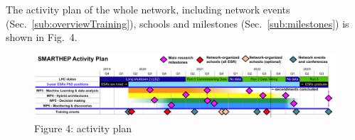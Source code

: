 The activity plan of the whole network, including network events (Sec.~\ref{sub:overviewTraining}), schools and milestones (Sec.~\ref{sub:milestones}) is shown in Fig.~4. 
\begin{figure}
\begin{center}
\includegraphics[width=\textwidth]{figs/Workplan.png} %
\caption*{Figure 4: \acronym activity plan}
\label{fig:workplan}
\end{center}
\vspace{-5mm}
\end{figure}

\FloatBarrier
\vspace{-8mm}
